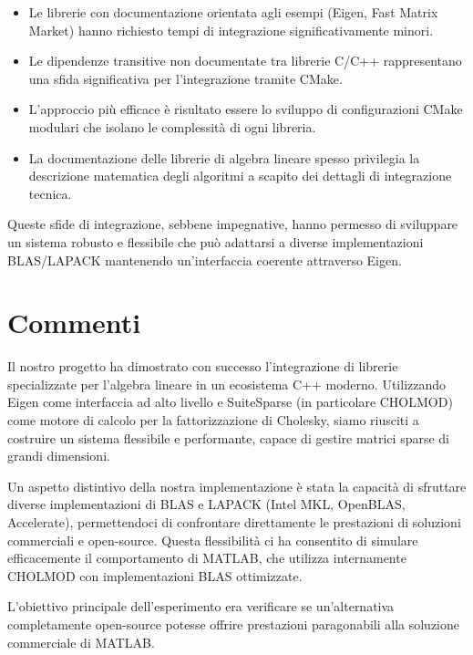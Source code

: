 \begin{itemize}
    \item Le librerie con documentazione orientata agli esempi (Eigen, Fast Matrix Market) hanno richiesto tempi di integrazione significativamente minori.
    
    \item Le dipendenze transitive non documentate tra librerie C/C++ rappresentano una sfida significativa per l'integrazione tramite CMake.
    
    \item L'approccio più efficace è risultato essere lo sviluppo di configurazioni CMake modulari che isolano le complessità di ogni libreria.
    
    \item La documentazione delle librerie di algebra lineare spesso privilegia la descrizione matematica degli algoritmi a scapito dei dettagli di integrazione tecnica.
\end{itemize}

Queste sfide di integrazione, sebbene impegnative, hanno permesso di sviluppare un sistema robusto e flessibile che può adattarsi a diverse implementazioni BLAS/LAPACK mantenendo un'interfaccia coerente attraverso Eigen.

\section{Commenti}

Il nostro progetto ha dimostrato con successo l'integrazione di librerie specializzate per l'algebra lineare in un ecosistema C++ moderno. 
Utilizzando Eigen come interfaccia ad alto livello e SuiteSparse (in particolare CHOLMOD) come motore di calcolo per la fattorizzazione di 
Cholesky, siamo riusciti a costruire un sistema flessibile e performante, capace di gestire matrici sparse di grandi dimensioni.

Un aspetto distintivo della nostra implementazione è stata la capacità di sfruttare diverse implementazioni di BLAS e LAPACK 
(Intel MKL, OpenBLAS, Accelerate), permettendoci di confrontare direttamente le prestazioni di soluzioni commerciali e open-source. 
Questa flessibilità ci ha consentito di simulare efficacemente il comportamento di MATLAB, che utilizza internamente CHOLMOD con 
implementazioni BLAS ottimizzate.

L'obiettivo principale dell'esperimento era verificare se un'alternativa completamente open-source potesse offrire prestazioni 
paragonabili alla soluzione commerciale di MATLAB.

